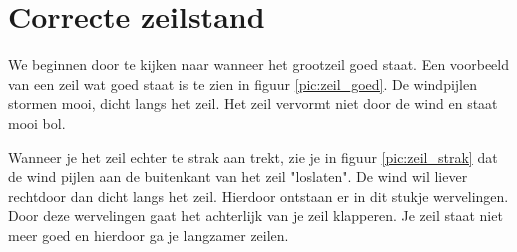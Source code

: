 \section{Correcte zeilstand}
We beginnen door te kijken naar wanneer het grootzeil goed staat. Een voorbeeld van een zeil wat goed staat is te zien in figuur \ref{pic:zeil_goed}. De windpijlen stormen mooi, dicht langs het zeil. Het zeil vervormt niet door de wind en staat mooi bol.

Wanneer je het zeil echter te strak aan trekt, zie je in figuur \ref{pic:zeil_strak} dat de wind pijlen aan de buitenkant van het zeil "loslaten". De wind wil liever rechtdoor dan dicht langs het zeil. Hierdoor ontstaan er in dit stukje wervelingen. Door deze wervelingen gaat het achterlijk van je zeil klapperen. Je zeil staat niet meer goed en hierdoor ga je langzamer zeilen.    
